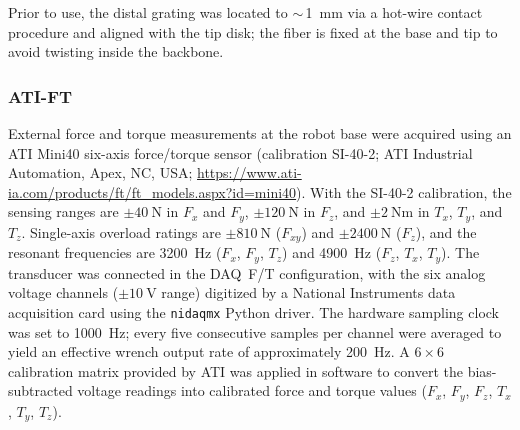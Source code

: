 \documentclass[14pt, a4paper]{article}
\begin{document}
Prior to use, the distal grating was located to $\sim$\,\SI{1}{\milli\meter} via a hot-wire contact procedure and aligned with the tip disk; the fiber is fixed at the base and tip to avoid twisting inside the backbone.


\subsubsection{ATI-FT}

External force and torque measurements at the robot base were acquired using an ATI Mini40
six-axis force/torque sensor (calibration SI-40-2; ATI Industrial Automation, Apex, NC, USA;
\url{https://www.ati-ia.com/products/ft/ft_models.aspx?id=mini40}).
With the SI-40-2 calibration, the sensing ranges are
$\pm\SI{40}{\newton}$ in $F_x$ and $F_y$,
$\pm\SI{120}{\newton}$ in $F_z$,
and $\pm\SI{2}{\newton\meter}$ in $T_x$, $T_y$, and $T_z$.
Single-axis overload ratings are $\pm\SI{810}{\newton}$ ($F_{xy}$) and
$\pm\SI{2400}{\newton}$ ($F_z$), and the resonant frequencies are
\SI{3200}{\hertz} ($F_x$, $F_y$, $T_z$) and \SI{4900}{\hertz} ($F_z$, $T_x$, $T_y$).
The transducer was connected in the DAQ~F/T configuration, with the six analog voltage channels
($\pm\SI{10}{\volt}$ range) digitized by a National Instruments data acquisition card
using the \texttt{nidaqmx} Python driver.
The hardware sampling clock was set to \SI{1000}{\hertz}; every five consecutive samples
per channel were averaged to yield an effective wrench output rate of approximately \SI{200}{\hertz}.
A $6\times6$ calibration matrix provided by ATI was applied in software to convert the
bias-subtracted voltage readings into calibrated force and torque values
($F_x$, $F_y$, $F_z$, $T_x$, $T_y$, $T_z$).

\end{document}
